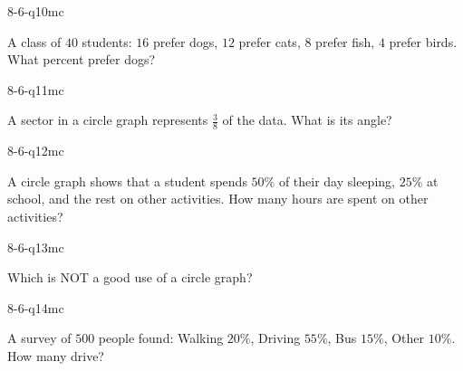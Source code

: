 \begin{practiceQuestion}{8-6-q10}{mc}
\begin{questionText}
A class of $40$ students: $16$ prefer dogs, $12$ prefer cats, $8$ prefer fish, $4$ prefer birds. What percent prefer dogs?
\end{questionText}
\end{practiceQuestion}

\begin{practiceQuestion}{8-6-q11}{mc}
\begin{questionText}
A sector in a circle graph represents $\frac{3}{8}$ of the data. What is its angle?
\end{questionText}
\end{practiceQuestion}

\begin{practiceQuestion}{8-6-q12}{mc}
\begin{questionText}
A circle graph shows that a student spends $50\%$ of their day sleeping, $25\%$ at school, and the rest on other activities. How many hours are spent on other activities?
\end{questionText}
\end{practiceQuestion}

\begin{practiceQuestion}{8-6-q13}{mc}
\begin{questionText}
Which is NOT a good use of a circle graph?
\end{questionText}
\end{practiceQuestion}

\begin{practiceQuestion}{8-6-q14}{mc}
\begin{questionText}
A survey of $500$ people found: Walking $20\%$, Driving $55\%$, Bus $15\%$, Other $10\%$. How many drive?
\end{questionText}
\end{practiceQuestion}

